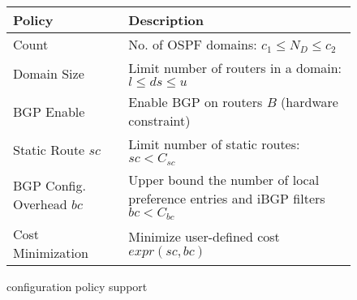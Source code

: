\begin{wrapfigure}{r}{0.55\textwidth}
\vspace{-3mm}
\small
\begin{minipage}{\linewidth}
	\begin{tabular}{m{6em}  m{15.6em} } 
			{\bf Policy} & {\bf Description} \\ 
			\hline
			Count  & No. of OSPF domains: $c_1\leq N_D\leq c_2$  \\ \hline
			Domain Size  & Limit number of routers in a domain: $l\leq ds\leq u$ \\ \hline
			BGP Enable & Enable BGP on routers $B$ (hardware constraint) \\ \hline
			Static Route ${sc}$ & Limit number of static routes: $sc < C_{sc}$ \\ \hline
			BGP Config. Overhead $bc$ & Upper bound the number of local preference entries and iBGP filters $bc < C_{bc}$ \\ \hline
			Cost Minimization & Minimize user-defined cost $expr(sc, bc)$
		\end{tabular}
				
	\end{minipage}
\caption{\name configuration policy support} 
\label{tab:configpolicysupport}
\end{wrapfigure}